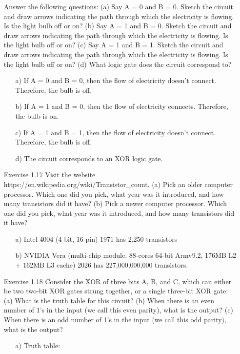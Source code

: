 \documentclass{article}
\begin{document}
\begin{enumerate}
    Answer the following questions:\newline
    (a) Say A = 0 and B = 0. Sketch the circuit and draw arrows indicating the path through which the electricity is flowing. Is the light bulb off or on?\newline
    (b) Say A = 1 and B = 0. Sketch the circuit and draw arrows indicating the path through which the electricity is flowing. Is the light bulb off or on?\newline
    (c) Say A = 1 and B = 1. Sketch the circuit and draw arrows indicating the path through which the electricity is flowing. Is the light bulb off or on?\newline
    (d) What logic gate does the circuit correspond to?

    \begin{enumerate}
        \item[a)] If A = 0 and B = 0, then the flow of electricity doesn't connect. Therefore, the bulb is off.
        \item[b)] If A = 1 and B = 0, then the flow of electricity connects. Therefore, the bulb is on.
        \item[c)] If A = 1 and B = 1, then the flow of electricity doesn't connect. Therefore, the bulb is off.
        \item[d)] The circuit corresponds to an XOR logic gate.
    \end{enumerate}


    \item[Exercise 1.17] Visit the website https://en.wikipedia.org/wiki/Transistor\_count.\newline
    (a) Pick an older computer processor. Which one did you pick, what year was it introduced, and how many transistors did it have?\newline
    (b) Pick a newer computer processor. Which one did you pick, what year was it introduced, and how many transistors did it have?
    \begin{enumerate}
        \item[a)] Intel 4004 (4-bit, 16-pin) 1971 has 2,250 transistors
        \item[b)] NVIDIA Vera (multi-chip module, 88-cores 64-bit Armv9.2, 176MB L2 + 162MB L3 cache) 2026 has 227,000,000,000 transistors.
    \end{enumerate}


    \item[Exercise 1.18] Consider the XOR of three bits A, B, and C, which can either be two two-bit XOR gates strung together, or a single three-bit XOR gate:\newline
    (a) What is the truth table for this circuit?\newline
    (b) When there is an even number of 1’s in the input (we call this even parity), what is the output?\newline
    (c) When there is an odd number of 1’s in the input (we call this odd parity), what is the output?
    \begin{enumerate}
        \item[a)] Truth table:


\end{enumerate}
\end{enumerate}
\end{document}
